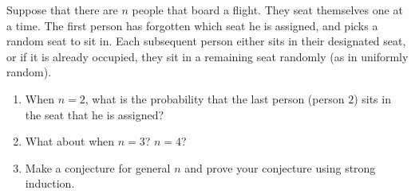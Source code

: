 Suppose that there are $n$ people that board a flight. They seat themselves one at a time. The first person has forgotten which seat he is assigned, and picks a random seat to sit in. Each subsequent person either sits in their designated seat, or if it is already occupied, they sit in a remaining seat randomly (as in uniformly random).
\begin{enumerate}
	\item When $n = 2$, what is the probability that the last person (person $2$) sits in the seat that he is assigned?
	\item What about when $n = 3$? $n = 4$?
	\item Make a conjecture for general $n$ and prove your conjecture using strong induction.
\end{enumerate}